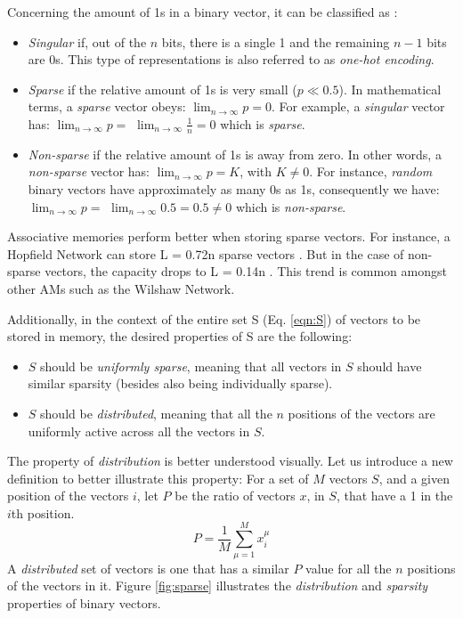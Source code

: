 \documentclass[runningheads]{llncs}
\begin{document}
Concerning the amount of 1s in a binary vector, it can be classified as \cite{palm1996associative}:
\begin{itemize}
    \item \textit{Singular} if, out of the $n$ bits, there is a single 1 and the remaining $n-1$ bits are 0s. This type of representations is also referred to as \textit{one-hot encoding}.
    \item \textit{Sparse} if the relative amount of 1s is very small ($p\ll0.5$). In mathematical terms, a\textit{ sparse }vector obeys: $\lim _{n \rightarrow \infty} p=0$. For example, a \textit{singular} vector has: $\lim _{n \rightarrow \infty} p = $ $ \lim _{n \rightarrow \infty} \frac{1}{n} = 0$ which is \textit{sparse}.
    \item \textit{Non-sparse} if the relative amount of 1s is away from zero. In other words, a \textit{non-sparse} vector has: $\lim _{n \rightarrow \infty} p=K$, with $K \neq 0$. For instance, \textit{random} binary vectors have approximately as many 0s as 1s, consequently we have: $\lim _{n \rightarrow \infty} p = $ $ \lim _{n \rightarrow \infty} 0.5 = 0.5 \neq 0$ which is \textit{non-sparse}.
\end{itemize}
Associative memories perform better when storing sparse vectors. For instance, a Hopfield Network can store L = 0.72n sparse vectors \cite{gardner1988space}. But in the case of non-sparse vectors, the capacity drops to L = 0.14n \cite{hopfield1982neural}. This trend is common amongst other AMs such as the Wilshaw Network.
\newline

Additionally, in the context of the entire set S (Eq. \ref{eqn:S}) of vectors to be stored in memory, the desired properties of S are the following:
\begin{itemize}
    \item $S$ should be \textit{uniformly sparse}, meaning that all vectors in $S$ should have similar sparsity (besides also being individually sparse).
    \item $S$ should be \textit{distributed}, meaning that all the $n$ positions of the vectors are uniformly active across all the vectors in $S$.
\end{itemize}

The property of \textit{distribution} is better understood visually. Let us introduce a new definition to better illustrate this property:
\newline
For a set of $M$ vectors $S$, and a given position of the vectors $i$, let $P$ be the ratio of vectors $x$, in $S$, that have a 1 in the $i$th position.
\begin{equation}
\label{eqn:P}
    P = \frac{1}{M}\sum_{\mu=1}^{M}x^{\mu}_i
\end{equation}
A \textit{distributed} set of vectors is one that has a similar $P$ value for all the $n$ positions of the vectors in it. Figure \ref{fig:sparse} illustrates the \textit{distribution} and \textit{sparsity} properties of binary vectors.
\end{document}
